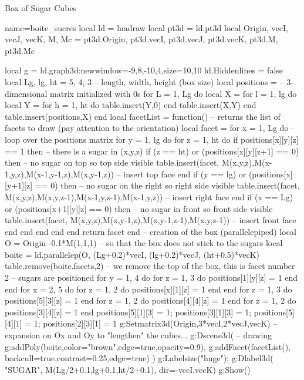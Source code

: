 \begin{demo}{Box of Sugar Cubes}
\begin{luadraw}{name=boite_sucres}
local ld = luadraw
local pt3d = ld.pt3d
local Origin, vecI, vecJ, vecK, M, Mc = pt3d.Origin, pt3d.vecI, pt3d.vecJ, pt3d.vecK, pt3d.M, pt3d.Mc

local g = ld.graph3d:new{window={-9,8,-10,4},size={10,10}}
ld.Hiddenlines = false
local Lg, lg, ht = 5, 4, 3 -- length, width, height (box size)
local positions = {} -- 3-dimensional matrix initialized with 0s
for L = 1, Lg do
    local X = {}
    for l = 1, lg do
        local Y = {}
        for h = 1, ht do table.insert(Y,0) end
        table.insert(X,Y)
    end
    table.insert(positions,X)
end
local facetList = function() -- returns the list of facets to draw (pay attention to the orientation)
    local facet = {}
    for x = 1, Lg do -- loop over the positions matrix
        for y = 1, lg do
            for z = 1, ht do
                if positions[x][y][z] == 1 then -- there is a sugar in (x,y,z)
                    if (z == ht) or (positions[x][y][z+1] == 0) then -- no sugar on top so top side visible
                        table.insert(facet, {M(x,y,z),M(x-1,y,z),M(x-1,y-1,z),M(x,y-1,z)}) -- insert top face
                    end
                    if (y == lg) or (positions[x][y+1][z] == 0) then -- no sugar on the right so right side visible
                        table.insert(facet, {M(x,y,z),M(x,y,z-1),M(x-1,y,z-1),M(x-1,y,z)}) -- insert right face
                    end
                    if (x == Lg) or (positions[x+1][y][z] == 0) then -- no sugar in front so front side visible
                        table.insert(facet, {M(x,y,z),M(x,y-1,z),M(x,y-1,z-1),M(x,y,z-1)}) -- insert front face
                    end
                end
            end
        end
    end
    return facet
end
-- creation of the box (parallelepiped)
local O = Origin -0.1*M(1,1,1) -- so that the box does not stick to the sugars
local boite = ld.parallelep(O, (Lg+0.2)*vecI, (lg+0.2)*vecJ, (ht+0.5)*vecK)
table.remove(boite.facets,2) -- we remove the top of the box, this is facet number 2
-- sugars are positioned
for y = 1, 4 do for z = 1, 3 do  positions[1][y][z] = 1 end end
for x = 2, 5 do for z = 1, 2 do positions[x][1][z] = 1 end end
for z = 1, 3 do positions[5][3][z] = 1 end
for z = 1, 2 do positions[4][4][z] = 1 end
for z = 1, 2 do positions[3][4][z] = 1 end
positions[5][1][3] = 1; positions[3][1][3] = 1; positions[5][4][1] = 1; positions[2][3][1] = 1
g:Setmatrix3d({Origin,3*vecI,2*vecJ,vecK}) -- expansion on Ox and Oy to "lengthen" the cubes...
g:Dscene3d( -- drawing
    g:addPoly(boite,{color="brown",edge=true,opacity=0.9}),
    g:addFacet(facetList(), {backcull=true,contrast=0.25,edge=true})    )
g:Labelsize("huge"); g:Dlabel3d( "SUGAR", M(Lg/2+0.1,lg+0.1,ht/2+0.1), {dir={-vecI,vecK}})
g:Show()
\end{luadraw}
\end{demo}

